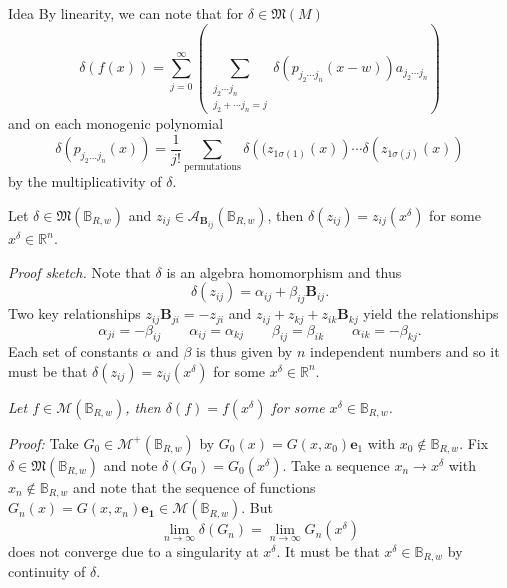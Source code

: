 \documentclass[aspectratio=169,handout]{beamer}
\newcommand{\R}{\mathbb{R}}
\newcommand{\algebra}{\mathcal{A}}
\newcommand{\characters}{\mathfrak{M}}
\newcommand{\monogenics}{\mathcal{M}}
\newcommand{\ball}{\mathbb{B}}
\newcommand{\blade}[1]{\boldsymbol{#1}}
\newcommand{\bivector}{\blade{B}}
\begin{document}
\begin{frame}{Idea}
\vfill
By linearity, we can note that for $\delta \in \characters(M)$
\[
\delta(f(x)) = \sum_{j=0}^\infty \left(\sum_{\substack{{j_2 \cdots j_n} \\ {j_2 + \cdots j_n = j}}} \delta(p_{j_2 \cdots j_n} (x-w)) a_{j_2 \cdots j_n} \right)
\]
and on each monogenic polynomial
\[
\delta(p_{j_2 \dots j_n}(x)) = \frac{1}{j!} \sum_{\textrm{permutations}}\delta\left((z_{1\sigma(1)}(x)\right) \cdots \delta\left(z_{1\sigma(j)}(x)\right)
\]
by the multiplicativity of $\delta$.
\vfill
\end{frame}

\begin{frame}{}
\vfill
\begin{lemma}
Let $\delta \in \characters(\ball_{R,w})$ and $z_{ij}\in \algebra_{\bivector_{ij}}(\ball_{R,w})$, then $\delta(z_{ij})=z_{ij}(x^\delta)$ for some $x^\delta \in \R^n$.
\end{lemma}
\emph{Proof sketch.} Note that $\delta$ is an algebra homomorphism and thus 
\[
\delta(z_{ij})=\alpha_{ij}+\beta_{ij}\bivector_{ij}.
\]
Two key relationships $z_{ij}\bivector_{ji}=-z_{ji}$ and $z_{ij}+z_{kj}+z_{ik}\bivector_{kj}$ yield the relationships
\[
\alpha_{ji}=-\beta_{ij} \qquad \alpha_{ij}=\alpha_{kj} \qquad \beta_{ij}=\beta_{ik} \qquad \alpha_{ik}=-\beta_{kj}.
\]
Each set of constants $\alpha$ and $\beta$ is thus given by $n$ independent numbers and so it must be that $\delta(z_{ij})=z_{ij}(x^\delta)$ for some $x^\delta \in \R^n$.
\vfill
\end{frame}

\begin{frame}{}
\vfill
\begin{lemma}[Identification]
\emph{Let $f\in \mathcal{M}(\ball_{R,w})$, then $\delta (f)=f(x^\delta)$ for some $x^\delta \in \ball_{R,w}$.}
\end{lemma}
\emph{Proof:} Take $G_0 \in \monogenics^+(\ball_{R,w})$ by $G_0(x) = G(x,x_0)\blade{e}_1$ with $x_0 \notin \ball_{R,w}$. Fix $\delta \in \characters(\ball_{R,w})$ and note $\delta(G_0)=G_0(x^\delta)$. Take a sequence $x_n \to x^\delta$ with $x_n \notin \ball_{R,w}$ and note that the sequence of functions $G_n(x)=G(x,x_n)\blade{e_1} \in \monogenics(\ball_{R,w})$. But 
\[
\lim_{n\to \infty} \delta(G_n) = \lim_{n\to \infty} G_n(x^\delta)
\]
does not converge due to a singularity at $x^\delta$. It must be that $x^\delta \in \ball_{R,w}$ by continuity of $\delta$.
\vfill
\end{frame}
\end{document}
